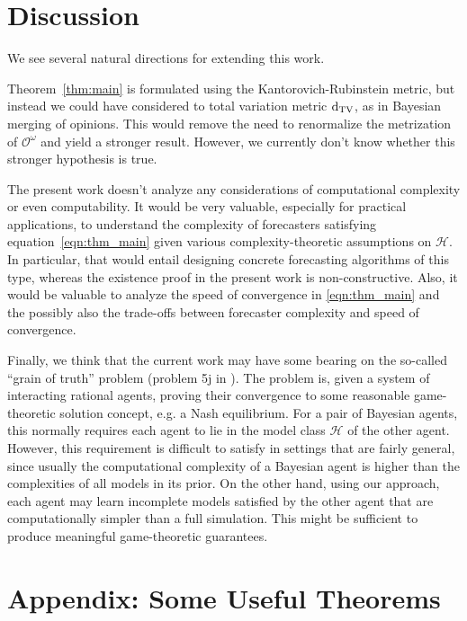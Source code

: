 \documentclass[11pt]{article}
\theoremstyle{definition}
\theoremstyle{plain}
\newcommand{\DTV}{\operatorname{d}_{\textnormal{TV}}}
\newcommand{\Ob}{\mathcal{O}}
\newcommand{\OO}{\Ob^\omega}
\newcommand{\MC}{\mathcal{H}}
\begin{document}
\section{Discussion}

We see several natural directions for extending this work.

Theorem~\ref{thm:main} is formulated using the Kantorovich-Rubinstein metric, but instead we could have considered to total variation metric $\DTV$, as in Bayesian merging of opinions\cite{Blackwell_1962}. This would remove the need to renormalize the metrization of $\OO$ and yield a stronger result. However, we currently don't know whether this stronger hypothesis is true.

The present work doesn't analyze any considerations of computational complexity or even computability. It would be very valuable, especially for practical applications, to understand the complexity of forecasters satisfying equation~\ref{eqn:thm_main} given various complexity-theoretic assumptions on $\MC$. In particular, that would entail designing concrete forecasting algorithms of this type, whereas the existence proof in the present work is non-constructive. Also, it would be valuable to analyze the speed of convergence in \ref{eqn:thm_main} and the possibly also the trade-offs between forecaster complexity and speed of convergence.

Finally, we think that the current work may have some bearing on the so-called \enquote{grain of truth} problem (problem 5j in \cite{Hutter_2009}). The problem is, given a system of interacting rational agents, proving their convergence to some reasonable game-theoretic solution concept, e.g. a Nash equilibrium. For a pair of Bayesian agents, this normally requires each agent to lie in the model class $\MC$ of the other agent. However, this requirement is difficult to satisfy in settings that are fairly general, since usually the computational complexity of a Bayesian agent is higher than the complexities of all models in its prior. On the other hand, using our approach, each agent may learn incomplete models satisfied by the other agent that are computationally simpler than a full simulation. This might be sufficient to produce meaningful game-theoretic guarantees.

\appendix

\section{Appendix: Some Useful Theorems}
\label{sec:theorems}
\end{document}
